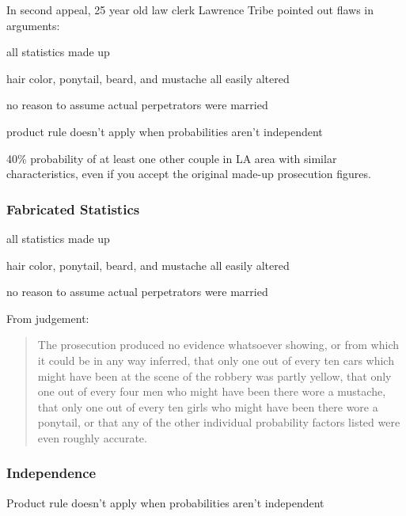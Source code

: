 \documentclass[landscape]{exam}
\begin{document}
  In second appeal, 25 year old law clerk Lawrence Tribe pointed out flaws in
  arguments:

  \begin{itemize*}
    \item all statistics made up
    \item hair color, ponytail, beard, and mustache all easily altered
    \item no reason to assume actual perpetrators were married 
    \item product rule doesn't apply when probabilities aren't independent

    \item 40\% probability of at least one other couple in LA area with similar
      characteristics, even if you accept the original made-up prosecution
      figures. 

  \end{itemize*}

  \subsubsection{Fabricated Statistics}
  \begin{itemize*}
    \item all statistics made up
    \item hair color, ponytail, beard, and mustache all easily altered
    \item no reason to assume actual perpetrators were married 
  \end{itemize*}

  From judgement:
  \begin{quote}
    \begin{em}
      The prosecution produced no evidence whatsoever showing, or from which it could
      be in any way inferred, that only one out of every ten cars which might have
      been at the scene of the robbery was partly yellow, that only one out of every
      four men who might have been there wore a mustache, that only one out of every
      ten girls who might have been there wore a ponytail, or that any of the other
      individual probability factors listed were even roughly accurate.
    \end{em}
  \end{quote}

  \subsubsection{Independence}
  Product rule doesn't apply when probabilities aren't independent
\end{document}

